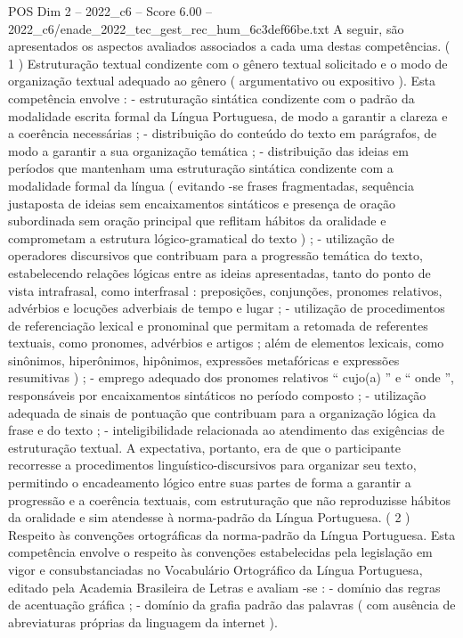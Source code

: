 \begin{textsample}{POS Dim 2 – 2022\_c6 – Score 6.00 – 2022\_c6/enade\_2022\_tec\_gest\_rec\_hum\_6c3def66be.txt}
A seguir, são apresentados os aspectos avaliados associados a cada uma destas competências. ( 1 ) Estruturação textual condizente com o gênero textual solicitado e o modo de organização textual adequado ao gênero ( argumentativo ou expositivo ).
Esta competência envolve : - estruturação sintática condizente com o padrão da modalidade escrita formal da Língua Portuguesa, de modo a garantir a clareza e a coerência necessárias ; - distribuição do conteúdo do texto em parágrafos, de modo a garantir a sua organização temática ; - distribuição das ideias em períodos que mantenham uma estruturação sintática condizente com a modalidade formal da língua ( evitando -se frases fragmentadas, sequência justaposta de ideias sem encaixamentos sintáticos e presença de oração subordinada sem oração principal que reflitam hábitos da oralidade e comprometam a estrutura lógico-gramatical do texto ) ; - utilização de operadores discursivos que contribuam para a progressão temática do texto, estabelecendo relações lógicas entre as ideias apresentadas, tanto do ponto de vista intrafrasal, como interfrasal : preposições, conjunções, pronomes relativos, advérbios e locuções adverbiais de tempo e lugar ; - utilização de procedimentos de referenciação lexical e pronominal que permitam a retomada de referentes textuais, como pronomes, advérbios e artigos ; além de elementos lexicais, como sinônimos, hiperônimos, hipônimos, expressões metafóricas e expressões resumitivas ) ; - emprego adequado dos pronomes relativos “ cujo(a) ” e “ onde ”, responsáveis por encaixamentos sintáticos no período composto ; - utilização adequada de sinais de pontuação que contribuam para a organização lógica da frase e do texto ; - inteligibilidade relacionada ao atendimento das exigências de estruturação textual.
A expectativa, portanto, era de que o participante recorresse a procedimentos linguístico-discursivos para organizar seu texto, permitindo o encadeamento lógico entre suas partes de forma a garantir a progressão e a coerência textuais, com estruturação que não reproduzisse hábitos da oralidade e sim atendesse à norma-padrão da Língua Portuguesa. ( 2 ) Respeito às convenções ortográficas da norma-padrão da Língua Portuguesa.
Esta competência envolve o respeito às convenções estabelecidas pela legislação em vigor e consubstanciadas no Vocabulário Ortográfico da Língua Portuguesa, editado pela Academia Brasileira de Letras e avaliam -se : - domínio das regras de acentuação gráfica ; - domínio da grafia padrão das palavras ( com ausência de abreviaturas próprias da linguagem da internet ).

\end{textsample}
